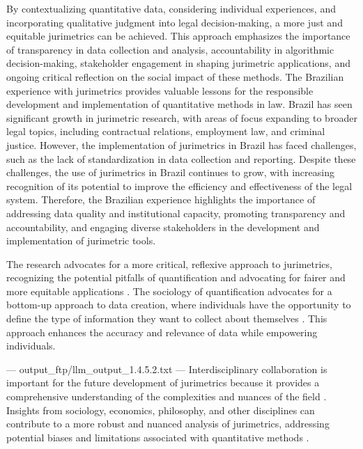 By contextualizing quantitative data, considering individual experiences, and incorporating qualitative judgment into legal decision-making, a more just and equitable jurimetrics can be achieved. This approach emphasizes the importance of transparency in data collection and analysis, accountability in algorithmic decision-making, stakeholder engagement in shaping jurimetric applications, and ongoing critical reflection on the social impact of these methods. The Brazilian experience with jurimetrics provides valuable lessons for the responsible development and implementation of quantitative methods in law. Brazil has seen significant growth in jurimetric research, with areas of focus expanding to broader legal topics, including contractual relations, employment law, and criminal justice. However, the implementation of jurimetrics in Brazil has faced challenges, such as the lack of standardization in data collection and reporting. Despite these challenges, the use of jurimetrics in Brazil continues to grow, with increasing recognition of its potential to improve the efficiency and effectiveness of the legal system. Therefore, the Brazilian experience highlights the importance of addressing data quality and institutional capacity, promoting transparency and accountability, and engaging diverse stakeholders in the development and implementation of jurimetric tools.

The research advocates for a more critical, reflexive approach to jurimetrics, recognizing the potential pitfalls of quantification and advocating for fairer and more equitable applications \cite{10.1590/data.2022.65.3.267}. The sociology of quantification advocates for a bottom-up approach to data creation, where individuals have the opportunity to define the type of information they want to collect about themselves \cite{10.1590/data.2022.65.3.267}. This approach enhances the accuracy and relevance of data while empowering individuals.


---
output_ftp/llm_output_1.4.5.2.txt
---
Interdisciplinary collaboration is important for the future development of jurimetrics because it provides a comprehensive understanding of the complexities and nuances of the field \cite{10.1007/s11186-021-09453-1,10.5040/9781350220645}. Insights from sociology, economics, philosophy, and other disciplines can contribute to a more robust and nuanced analysis of jurimetrics, addressing potential biases and limitations associated with quantitative methods \cite{10.1007/s11186-021-09453-1,10.5040/9781350220645}.

